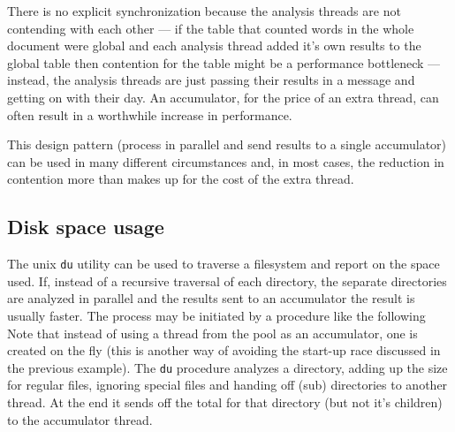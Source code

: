 There is no explicit synchronization because the analysis threads are not
contending with each other --- if the table that counted words in the whole
document were global and each analysis thread added it's own results to the
global table then contention for the table might be a performance bottleneck ---
instead, the analysis threads are just passing their results in a message and
getting on with their day. An accumulator, for the price of an extra
thread, can often result in a worthwhile increase in performance.

This design pattern (process in parallel and send results to a single
accumulator) can be used in many different circumstances and, in most cases, the
reduction in contention more than makes up for the cost of the extra
thread. 

\bigskip

\subsection{Disk space usage}
The unix \texttt{du} utility can be used to traverse a filesystem and report on
the space used.  If, instead of a recursive traversal of each directory, the
separate directories are analyzed in parallel and the results sent to an
accumulator the result is usually faster. The process may be initiated by a
procedure like the following
{\small
{}
}
Note that instead of using a thread from the pool as an accumulator, one is
created on the fly (this is another way of avoiding the start-up race discussed
in the previous example). The \texttt{du} procedure analyzes a directory, adding
up the size for regular files, ignoring special files and handing off (sub)
directories to another thread. At the end it sends off the total for that
directory (but not it's children) to the accumulator thread.

